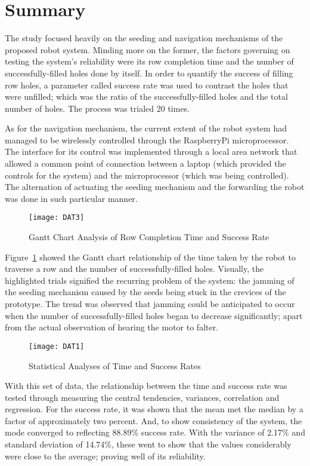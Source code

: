 \section{Summary}

The study focused heavily on the seeding and navigation mechanisms of the proposed robot system. Minding more on the former, the factors governing on testing the system’s reliability were its row completion time and the number of successfully-filled holes done by itself. In order to quantify the success of filling row holes, a parameter called success rate was used to contrast the holes that were unfilled; which was the ratio of the successfully-filled holes and the total number of holes. The process was trialed 20 times.

As for the navigation mechanism, the current extent of the robot system had managed to be wirelessly controlled through the RaspberryPi microprocessor. The interface for its control was implemented through a local area network that allowed a common point of connection between a laptop (which provided the controls for the system) and the microprocessor (which was being controlled). The alternation of actuating the seeding mechanism and the forwarding the robot was done in such particular manner.

\begin{figure}[h]
	\centering
		\texttt{[image: DAT3]}
	\caption{Gantt Chart Analysis of Row Completion Time and Success Rate }
	\label{fig:DAT3}
\end{figure}

Figure~\ref{fig:DAT3} showed the Gantt chart relationship of the time taken by the robot to traverse a row and the number of successfully-filled holes. Visually, the highlighted trials signified the recurring problem of the system: the jamming of the seeding mechanism caused by the seeds being stuck in the crevices of the prototype. The trend was observed that jamming could be anticipated to occur when the number of successfully-filled holes began to decrease significantly; apart from the actual observation of hearing the motor to falter.

\begin{figure}[h]
	\centering
		\texttt{[image: DAT1]}
	\caption{Statistical Analyses of Time and Success Rates }
	\label{fig:DAT1}
\end{figure}

With this set of data, the relationship between the time and success rate was tested through measuring the central tendencies, variances, correlation and regression. For the success rate, it was shown that the mean met the median by a factor of approximately two percent. And, to show consistency of the system, the mode converged to reflecting 88.89\% success rate. With the variance of 2.17\% and standard deviation of 14.74\%, these went to show that the values considerably were close to the average; proving well of its reliability.

